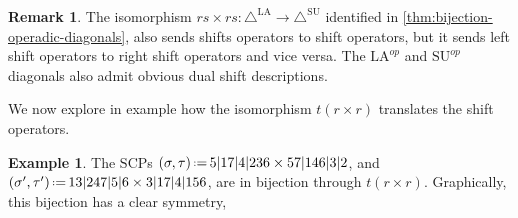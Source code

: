 \documentclass{amsart}
\theoremstyle{definition}
\newtheorem{example}[theorem]{Example}
\newtheorem{remark}[theorem]{Remark}
\newcommand{\eqdef}{\mbox{\,\raisebox{0.2ex}{\scriptsize\ensuremath{\mathrm:}}\ensuremath{=}\,}} %
\newcommand{\SU}{\mathrm{SU}}
\newcommand{\LA}{\mathrm{LA}}
\newcommand{\SUD}{\triangle^{\mathrm{SU}}}
\newcommand{\LAD}{\triangle^{\mathrm{LA}}}
\newcommand{\SCP}{\mathrm{SCP}}
\begin{document}
\begin{remark}
The isomorphism $rs\times rs:\LAD \to \SUD$ identified in \cref{thm:bijection-operadic-diagonals}, also sends shifts operators to shift operators, but it sends left shift operators to right shift operators and vice versa.
The $\LA^{op}$ and $\SU^{op}$ diagonals also admit obvious dual shift descriptions.
\end{remark}

We now explore in example how the isomorphism $t(r\times r)$ translates the shift operators.

\begin{example} \label{ex:shift translation by theta}
The $\SCP$s $(\sigma,\tau)  \eqdef  5|17|4|236 \times 57|146|3|2$, and $(\sigma',\tau')  \eqdef  13|247|5|6 \times 3|17|4|156$, are in bijection through $t(r\times r)$. Graphically, this bijection has a clear symmetry,


\end{example}
\end{document}
